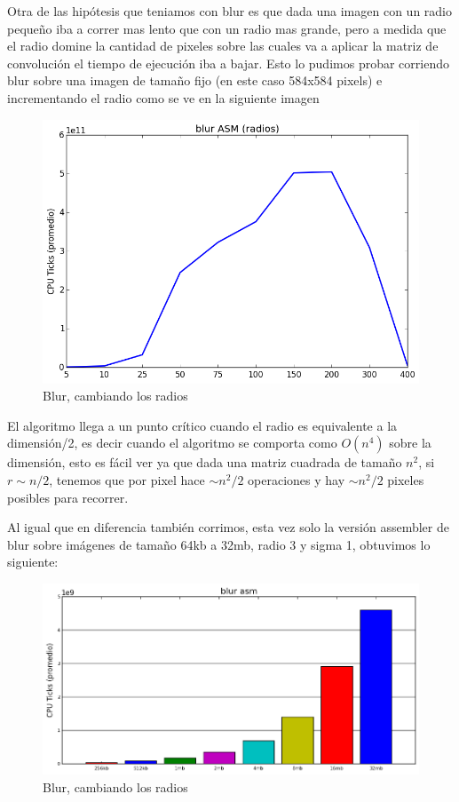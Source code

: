 \documentclass[a4paper]{article}
\begin{document}
 Otra de las hipótesis que teniamos con blur es que dada una imagen con un radio pequeño iba a correr mas lento que con un radio mas grande, pero a medida que el radio domine la cantidad de pixeles sobre las cuales va a aplicar la matriz de convolución el tiempo de ejecución iba a bajar. Esto lo pudimos probar corriendo blur sobre una imagen de tamaño fijo (en este caso 584x584 pixels) e incrementando el radio como se ve en la siguiente imagen


\begin{figure}[h]
	\centerline{\includegraphics[scale=0.62]{imagenes/test_radio_size_ASM.png}}
	\caption{Blur, cambiando los radios}
\end{figure}


El algoritmo llega a un punto crítico cuando el radio es equivalente a la dimensión/2, es decir cuando el algoritmo se comporta como $O(n^4)$ sobre la dimensión, esto es fácil ver ya que dada una matriz cuadrada de tamaño $n^2$, si $r \sim n/2$, tenemos que por pixel hace $\sim n^2/2$ operaciones y hay $\sim n^2/2$ pixeles posibles para recorrer.

Al igual que en diferencia también corrimos, esta vez solo la versión assembler de blur sobre imágenes de tamaño 64kb a 32mb, radio 3 y sigma 1, obtuvimos lo siguiente:

\begin{figure}[h]
	\centerline{\includegraphics[scale=0.72]{imagenes/test_radio_cambiando_tamanios_assembly.png}}
	\caption{Blur, cambiando los radios}
\end{figure}
\end{document}
